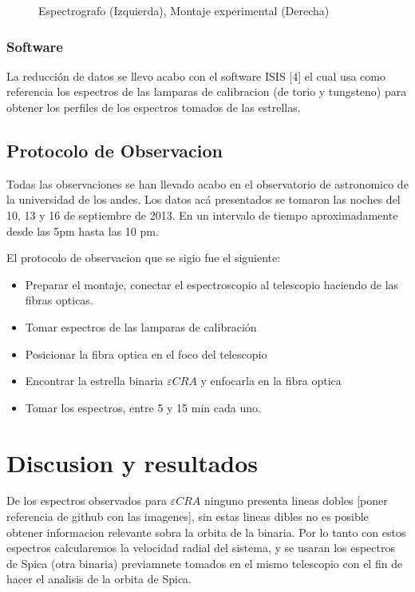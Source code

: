 \documentclass[Proceedings]{ascelike}
\begin{document}
\begin{figure}
\caption{Espectrografo (Izquierda), Montaje experimental (Derecha)\label{espectrografo}}
\end{figure}



\subsubsection{Software}

La reducci\'on de datos se llevo acabo con el software ISIS [4]
el cual usa como referencia los espectros de las lamparas de calibracion (de torio y tungsteno)
para obtener los perfiles de los espectros tomados de las estrellas.

\subsection{Protocolo de Observacion}

Todas las observaciones se han llevado acabo en el observatorio de astronomico
de la universidad de los andes. Los datos ac\'a presentados se tomaron las noches
del 10, 13 y 16 de septiembre de 2013. En un intervalo de tiempo aproximadamente 
desde las 5pm hasta las 10 pm. 

El protocolo de observacion que se sigio fue el siguiente:

\begin{itemize}
\item Preparar el montaje, conectar el espectroscopio al telescopio haciendo de las 
fibras opticas.
\item Tomar espectros de las lamparas de calibraci\'on 
\item Posicionar la fibra optica en el foco del telescopio
\item Encontrar la estrella binaria $\varepsilon CRA$ y enfocarla en la fibra optica
\item Tomar los espectros, entre 5 y 15 min cada uno.
\end{itemize}

\section{Discusion y resultados}

De los espectros observados para $\varepsilon CRA$ ninguno presenta 
lineas dobles [poner referencia de github con las imagenes], sin estas lineas dibles no es posible obtener informacion 
relevante sobra la orbita de la binaria. Por lo tanto con estos espectros
calcularemos la velocidad radial del sistema, y se usaran los espectros
de Spica (otra binaria) previamnete tomados en el mismo telescopio con el fin de hacer el analisis de la orbita de Spica.
\end{document}
